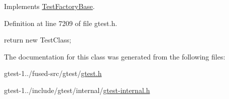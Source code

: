 \-Implements \hyperlink{classtesting_1_1internal_1_1TestFactoryBase_a54ad95f17b20927fd00c337710813519}{\-Test\-Factory\-Base}.



\-Definition at line 7209 of file gtest.\-h.


\begin{DoxyCode}
{ return new TestClass; }
\end{DoxyCode}


\-The documentation for this class was generated from the following files\-:\begin{DoxyCompactItemize}
\item 
gtest-\/1../fused-\/src/gtest/\hyperlink{fused-src_2gtest_2gtest_8h}{gtest.\-h}\item 
gtest-\/1../include/gtest/internal/\hyperlink{gtest-internal_8h}{gtest-\/internal.\-h}\end{DoxyCompactItemize}
